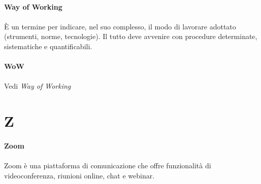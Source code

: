 \documentclass[10pt, a4paper]{article}
\begin{document}
\vspace{2em}
\paragraph{Way of Working}\noindent\hrulefill
\paragraph{}È un termine per indicare, nel suo complesso, il modo di lavorare adottato (strumenti, norme, tecnologie). Il tutto deve avvenire con procedure determinate, sistematiche e quantificabili.   

\vspace{2em}
\paragraph{WoW}\noindent\hrulefill
\paragraph{}Vedi \textit{Way of Working\pg}

\newpage
\section{Z}
\vspace{2em}
\paragraph{Zoom}\noindent\hrulefill
\paragraph{}Zoom è una piattaforma di comunicazione che offre funzionalità di videoconferenza, riunioni online, chat e webinar.
\end{document}
